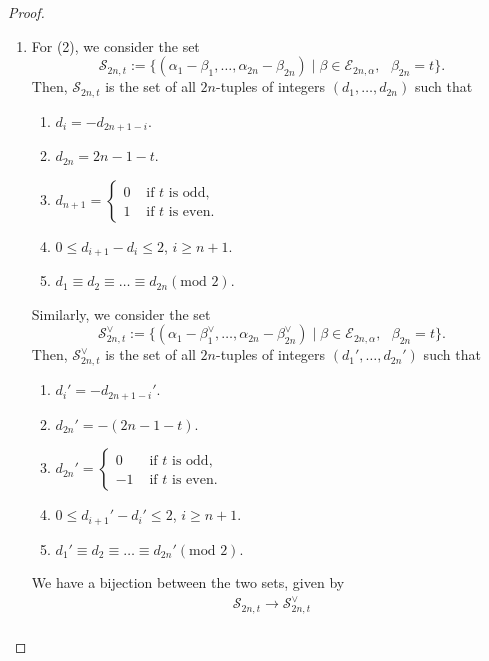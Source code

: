 \documentclass[11pt,oneside]{amsart}
\theoremstyle{plain}
\theoremstyle{definition}
\theoremstyle{remark}
\newcommand{\tx}[1]{\text{#1}}
\newcommand{\CE}{{\mathcal E}}
\newcommand{\ScS}{{\mathscr S}}
\numberwithin{equation}{section}
\begin{document}
\begin{proof}
\begin{enumerate}
			\item For (2), we consider the set
			\begin{equation*}
				\ScS_{2n,t}:=\lbrace (\alpha_1-\beta_1,\dots,\alpha_{2n}-\beta_{2n}) \mid \beta \in \CE_{2n,\alpha},\tx{ }\beta_{2n}=t\rbrace.
			\end{equation*}
			Then, $\ScS_{2n,t}$ is the set of all $2n$-tuples of integers $(d_1,\dots,d_{2n})$ such that
			\begin{enumerate}
				\item $d_i=-d_{2n+1-i}$.
				\item $d_{2n}=2n-1-t$.
				\item $d_{n+1}=\left \lbrace \begin{array}{ll} 0 & \tx{ if }t \tx{ is odd},\\
					1 & \tx{ if }t \tx{ is even}.
				\end{array}\right.$
				\item $0 \leq d_{i+1}-d_i\leq 2$, $i \geq n+1$.
				\item $d_1 \equiv d_2\equiv \dots \equiv d_{2n}(\tx{mod }2)$.
			\end{enumerate}
			Similarly, we consider the set
			\begin{equation*}
				\ScS_{2n,t}^{\vee}:=\lbrace (\alpha_1-\beta^{\vee}_1,\dots,\alpha_{2n}-\beta^{\vee}_{2n}) \mid \beta \in \CE_{2n,\alpha},\tx{ }\beta_{2n}=t\rbrace.
			\end{equation*}
			Then, $\ScS_{2n,t}^{\vee}$ is the set of all $2n$-tuples of integers $(d_1',\dots,d_{2n}')$ such that
			\begin{enumerate}
				\item $d_i'=-d_{2n+1-i}'$.
				\item $d_{2n}'=-(2n-1-t)$.
				\item $d_{2n}'=\left \lbrace \begin{array}{ll} 0 & \tx{ if }t \tx{ is odd},\\
					-1 & \tx{ if }t \tx{ is even}.
				\end{array}\right.$
				\item $0 \leq d_{i+1}'-d_i'\leq 2$, $i \geq n+1$.
				\item $d_1' \equiv d_2\equiv \dots \equiv d_{2n}'(\tx{mod }2)$.
			\end{enumerate}
			We have a bijection between the two sets, given by
			\begin{equation*}
				\begin{array}{c}
					\ScS_{2n,t}  \longrightarrow  \ScS_{2n,t}^{\vee}\\

\end{array}
\end{equation*}
\end{enumerate}
\end{proof}
\end{document}
